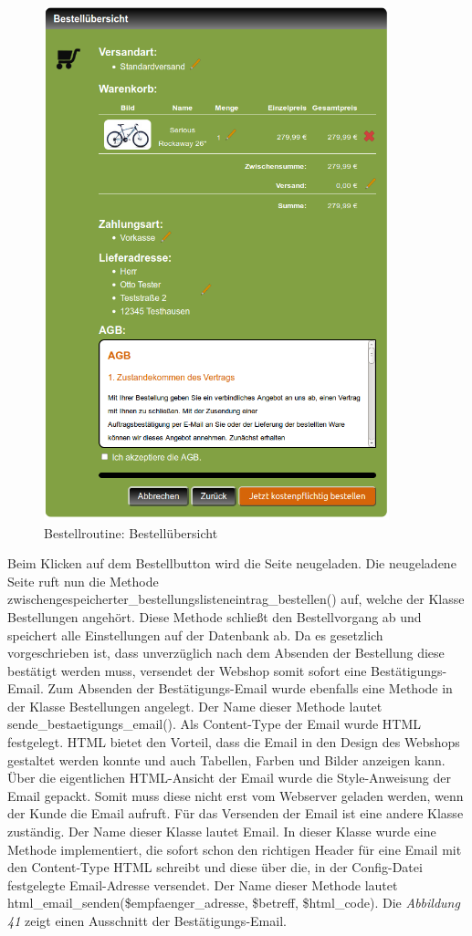 \begin{figure}[H]
	\begin{center}
			\includegraphics[width=100mm]{Bilder/bestelluebersicht.png}
	\end{center}
	\caption{Bestellroutine: Bestellübersicht}
\end{figure}

Beim Klicken auf dem  Bestellbutton wird die Seite neugeladen. Die neugeladene Seite ruft nun die Methode \glqq zwischengespeicherter\_bestellungslisteneintrag\_bestellen()\grqq{} auf, welche der Klasse \glqq Bestellungen\grqq{} angehört. Diese Methode schließt den Bestellvorgang ab und speichert alle Einstellungen auf der Datenbank ab. Da es gesetzlich vorgeschrieben ist, dass unverzüglich nach dem Absenden der Bestellung diese bestätigt werden muss, versendet der Webshop somit sofort eine Bestätigungs-Email. Zum Absenden der Bestätigungs-Email wurde ebenfalls eine Methode in der Klasse \glqq Bestellungen\grqq{} angelegt. Der Name dieser Methode lautet \glqq sende\_bestaetigungs\_email()\grqq{}. Als Content-Type der Email wurde HTML festgelegt. HTML bietet den Vorteil, dass die Email in den Design des Webshops gestaltet werden konnte und auch Tabellen, Farben und Bilder anzeigen kann. Über die eigentlichen HTML-Ansicht der Email wurde die Style-Anweisung der Email gepackt. Somit muss diese nicht erst vom Webserver geladen werden, wenn der Kunde die Email aufruft. Für das Versenden der Email ist eine andere Klasse zuständig. Der Name dieser Klasse lautet \glqq Email\grqq{}. In dieser Klasse wurde eine Methode implementiert, die sofort schon den richtigen Header für eine Email mit den Content-Type \glqq HTML\grqq{} schreibt und diese über die, in der \glqq Config-Datei\grqq{} festgelegte Email-Adresse versendet. Der Name dieser Methode lautet \glqq html\_email\_senden(\$empfaenger\_adresse, \$betreff, \$html\_code)\grqq{}. Die \textit{Abbildung 41} zeigt einen Ausschnitt der Bestätigungs-Email.

